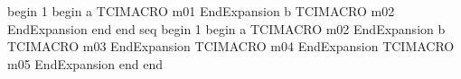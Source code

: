 begin
1
begin
a
TCIMACRO
m01
EndExpansion
b
TCIMACRO
m02
EndExpansion
end
end
seq
begin
1
begin
a
TCIMACRO
m02
EndExpansion
b
TCIMACRO
m03
EndExpansion
TCIMACRO
m04
EndExpansion
TCIMACRO
m05
EndExpansion
end
end
